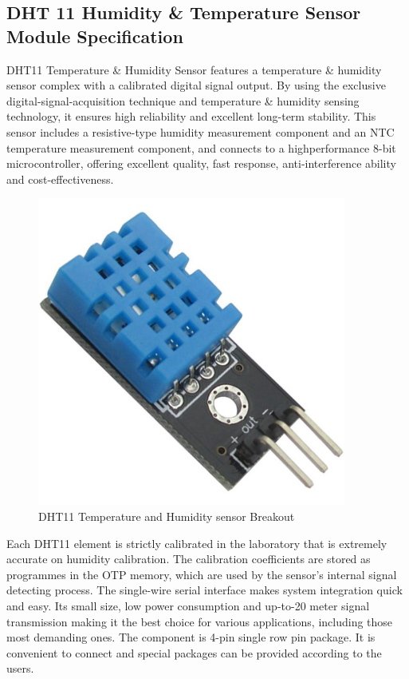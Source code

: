 \subsection{DHT 11 Humidity \& Temperature Sensor Module Specification}
DHT11 Temperature \& Humidity Sensor features a temperature \& humidity sensor complex with a calibrated digital signal output. By using the exclusive digital-signal-acquisition technique and temperature \& humidity sensing technology, it ensures high reliability and excellent long-term stability. This sensor includes a resistive-type humidity measurement component and an NTC temperature measurement component, and connects to a highperformance 8-bit microcontroller, offering excellent quality, fast response, anti-interference ability and cost-effectiveness.
\begin{figure}[h]
  \centering
  \includegraphics[width=4in]{43}
  \caption{DHT11 Temperature and Humidity sensor Breakout}\label{fig43}
\end{figure}
Each DHT11 element is strictly calibrated in the laboratory that is extremely accurate on humidity calibration. The calibration coefficients are stored as programmes in the OTP memory, which are used by the sensor’s internal signal detecting process\cite{jokar2016intrusion}. The single-wire serial interface makes system integration quick and easy. Its small size, low power consumption and up-to-20 meter signal transmission making it the best choice for various applications, including those most demanding ones. The component is 4-pin single row pin package. It is convenient to
connect and special packages can be provided according to the users.
\newpage

